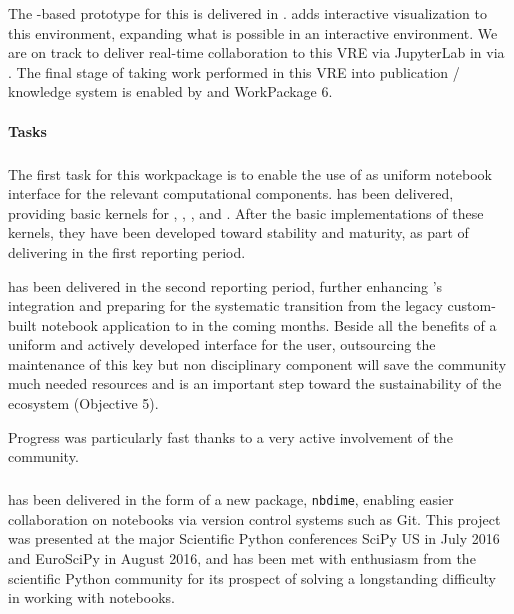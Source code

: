 The \Jupyter-based prototype for this is delivered in .
 adds interactive visualization to this environment,
expanding what is possible in an interactive \Jupyter environment.
We are on track to deliver real-time collaboration to this VRE via JupyterLab in  via .
The final stage of taking work performed in this VRE into publication / knowledge system is enabled by  and WorkPackage 6.

\paragraph{Tasks}

\subparagraph{}
\label{UI@ipython-kernels}

The first task for this workpackage is to enable the use of \Jupyter
as uniform notebook interface for the relevant computational
components.  has been delivered,
providing basic \Jupyter kernels for \GAP, \Pari, \Sage, and
\Singular.
After the basic implementations of these kernels,
they have been developed toward stability and maturity,
as part of delivering  in the first reporting period.

 has been delivered in the second reporting period, further
enhancing \Sage's \Jupyter integration and preparing for the
systematic transition from the legacy custom-built \Sage notebook
application to \Jupyter in the coming months. Beside all the benefits
of a uniform and actively developed interface for the user,
outsourcing the maintenance of this key but non disciplinary component
will save the \Sage community much needed resources and is an
important step toward the sustainability of the \ODK ecosystem
(Objective 5).

Progress was particularly fast thanks to a very active involvement of
the \Sage community.

\subparagraph{}

 has been delivered in the form of a new \Jupyter package, \texttt{nbdime},
enabling easier collaboration on notebooks via version control systems such as Git. This project
was presented at the major Scientific Python conferences SciPy US in July 2016 and EuroSciPy in August 2016,
and has been met with enthusiasm from the scientific Python community for its prospect of solving a
longstanding difficulty in working with notebooks.

